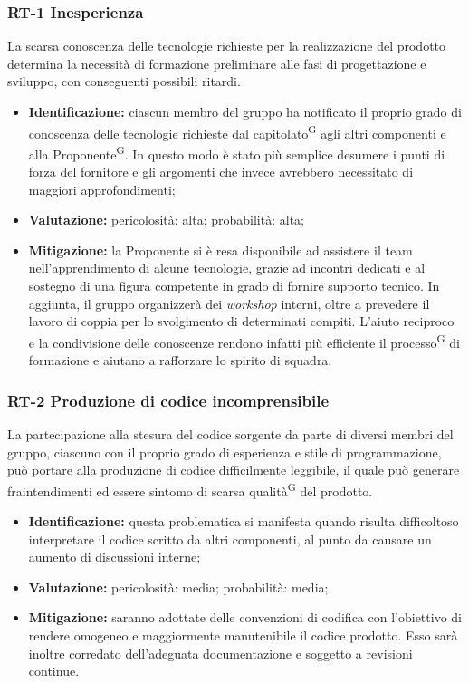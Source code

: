 \documentclass[8pt]{article}
\newcommand{\glossterm}[1]{#1\textsuperscript{G}} %
\begin{document}
\subsubsection{RT-1 Inesperienza}
La scarsa conoscenza delle tecnologie richieste per la realizzazione del prodotto determina la necessità di formazione preliminare alle fasi di progettazione e sviluppo, con conseguenti possibili ritardi.
\begin{itemize}
\setlength\itemsep{0em}
    \item \textbf{Identificazione:} ciascun membro del gruppo ha notificato il proprio grado di conoscenza delle tecnologie richieste dal \glossterm{capitolato} agli altri componenti e alla \glossterm{Proponente}. In questo modo è stato più semplice desumere i punti di forza del fornitore e gli argomenti che invece avrebbero necessitato di maggiori approfondimenti;
    \item \textbf{Valutazione:} pericolosità: alta; probabilità: alta;
    \item \textbf{Mitigazione:} la Proponente si è resa disponibile ad assistere il team nell'apprendimento di alcune tecnologie, grazie ad incontri dedicati e al sostegno di una figura competente in grado di fornire supporto tecnico. In aggiunta, il gruppo organizzerà dei \textit{workshop} interni, oltre a prevedere il lavoro di coppia per lo svolgimento di determinati compiti. L'aiuto reciproco e la condivisione delle conoscenze rendono infatti più efficiente il \glossterm{processo} di formazione e aiutano a rafforzare lo spirito di squadra.
\end{itemize}

\subsubsection{RT-2 Produzione di codice incomprensibile}
La partecipazione alla stesura del codice sorgente da parte di diversi membri del gruppo, ciascuno con il proprio grado di esperienza e stile di programmazione, può portare alla produzione di codice difficilmente leggibile, il quale può generare fraintendimenti ed essere sintomo di scarsa \glossterm{qualità} del prodotto. 
\begin{itemize}
\setlength\itemsep{0em}
    \item \textbf{Identificazione:} questa problematica si manifesta quando risulta difficoltoso interpretare il codice scritto da altri componenti, al punto da causare un aumento di discussioni interne;
    \item \textbf{Valutazione:} pericolosità: media; probabilità: media;
    \item \textbf{Mitigazione:} saranno adottate delle convenzioni di codifica con l'obiettivo di rendere omogeneo e maggiormente manutenibile il codice prodotto. Esso sarà inoltre corredato dell'adeguata documentazione e soggetto a revisioni continue.
\end{itemize}
\end{document}
